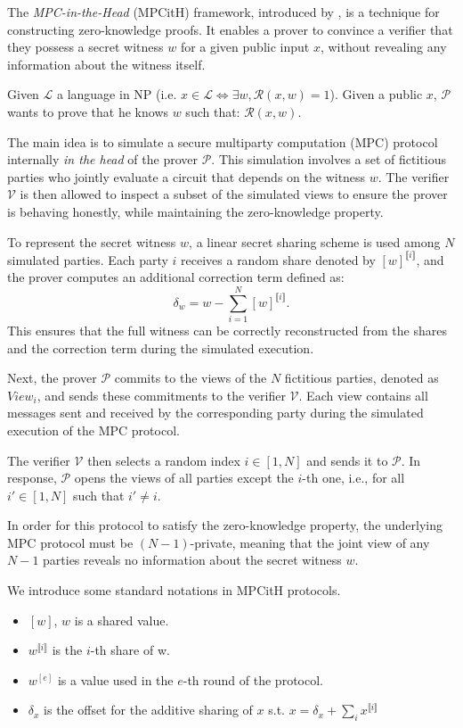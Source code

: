 \documentclass[english]{article}
\newcommand{\lir}{\llbracket i \rrbracket}
\begin{document}
		The \emph{MPC-in-the-Head} (MPCitH) framework, introduced by \cite{IKOS07}, is a technique for constructing zero-knowledge proofs. It enables a prover to convince a verifier that they possess a secret witness $w$ for a given public input $x$, without revealing any information about the witness itself.
		
		Given $\mathcal{L}$ a language in NP (i.e. $x \in \mathcal{L} \Longleftrightarrow \exists w, \mathcal{R}(x, w) = 1$). Given a public $x$, $\mathcal{P}$ wants to prove that he knows $w$ such that: $\mathcal{R}(x, w)$.
		
		The main idea is to simulate a secure multiparty computation (MPC) protocol internally \textit{in the head} of the prover $\mathcal{P}$. This simulation involves a set of fictitious parties who jointly evaluate a circuit that depends on the witness $w$. The verifier $\mathcal{V}$ is then allowed to inspect a subset of the simulated views to ensure the prover is behaving honestly, while maintaining the zero-knowledge property.
		
		To represent the secret witness $w$, a linear secret sharing scheme is used among $N$ simulated parties. Each party $i$ receives a random share denoted by $[w]^{\lir}$, and the prover computes an additional correction term defined as:
		$$
		\delta_w = w - \sum_{i=1}^{N} [w]^{\lir}.
		$$
		This ensures that the full witness can be correctly reconstructed from the shares and the correction term during the simulated execution.
		
		Next, the prover $\mathcal{P}$ commits to the views of the $N$ fictitious parties, denoted as $View_i$, and sends these commitments to the verifier $\mathcal{V}$. Each view contains all messages sent and received by the corresponding party during the simulated execution of the MPC protocol.
		
		The verifier $\mathcal{V}$ then selects a random index $i \in [1, N]$ and sends it to $\mathcal{P}$. In response, $\mathcal{P}$ opens the views of all parties except the $i$-th one, i.e., for all $i' \in [1, N]$ such that $i' \neq i$.
		
		In order for this protocol to satisfy the zero-knowledge property, the underlying MPC protocol must be $(N-1)$-private, meaning that the joint view of any $N-1$ parties reveals no information about the secret witness $w$.
		
		We introduce some standard notations in MPCitH protocols. 
		\begin{itemize}
			\item $[w]$, $w$ is a shared value.
			\item $w^{\lir}$ is the $i$-th share of w.
			\item $w^{[e]}$ is a value used in the $e$-th round of the protocol.
			\item $\delta_x$ is the offset for the additive sharing of $x$ s.t. $x = \delta_x + \sum_i x^{\lir}$
		\end{itemize}
		
\end{document}
